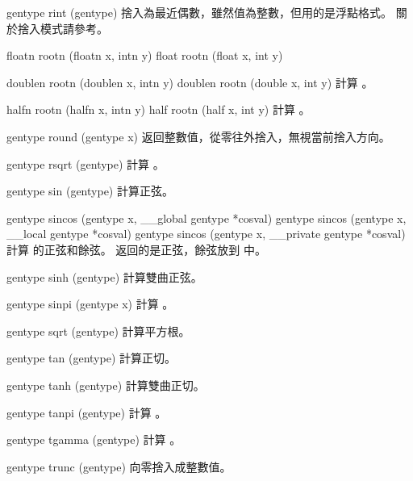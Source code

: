 gentype rint (gentype)
\stopbuffer
{}
捨入為最近偶數，雖然值為整數，但用的是浮點格式。
關於捨入模式請參考\insection[roundingMode]。
\stopbuffer

floatn rootn (floatn x, intn y)
float rootn (float x, int y)

doublen rootn (doublen x, intn y)
doublen rootn (double x, int y)
\stopbuffer
{}
計算 。
\stopbuffer

halfn rootn (halfn x, intn y)
half rootn (half x, int y)
\stopbuffer
{}
計算 。
\stopbuffer

gentype round (gentype x)
\stopbuffer
{}
返回整數值，從零往外捨入，無視當前捨入方向。
\stopbuffer

gentype rsqrt (gentype)
\stopbuffer
{}
計算 。
\stopbuffer

gentype sin (gentype)
\stopbuffer
{}
計算正弦。
\stopbuffer

gentype sincos (gentype x,
	__global gentype *cosval)
gentype sincos (gentype x,
	__local gentype *cosval)
gentype sincos (gentype x,
	__private gentype *cosval)
\stopbuffer
{}
計算  的正弦和餘弦。
返回的是正弦，餘弦放到  中。
\stopbuffer

gentype sinh (gentype)
\stopbuffer
{}
計算雙曲正弦。
\stopbuffer

gentype sinpi (gentype x)
\stopbuffer
{}
計算 。
\stopbuffer

gentype sqrt (gentype)
\stopbuffer
{}
計算平方根。
\stopbuffer

gentype tan (gentype)
\stopbuffer
{}
計算正切。
\stopbuffer

gentype tanh (gentype)
\stopbuffer
{}
計算雙曲正切。
\stopbuffer

gentype tanpi (gentype)
\stopbuffer
{}
計算 。
\stopbuffer

gentype tgamma (gentype)
\stopbuffer
{}
計算 。
\stopbuffer

gentype trunc (gentype)
\stopbuffer
{}
向零捨入成整數值。
\stopbuffer
